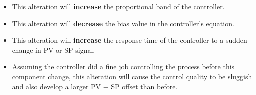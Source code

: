 





\begin{itemize}
\item{} This alteration will {\bf increase} the proportional band of the controller.
\vskip 10pt
\item{} This alteration will {\bf decrease} the bias value in the controller's equation.
\vskip 10pt
\item{} This alteration will {\bf increase} the response time of the controller to a sudden change in PV or SP signal.
\vskip 10pt
\item{} Assuming the controller did a fine job controlling the process before this component change, this alteration will cause the control quality to be sluggish and also develop a larger PV $-$ SP offset than before.
\end{itemize}











